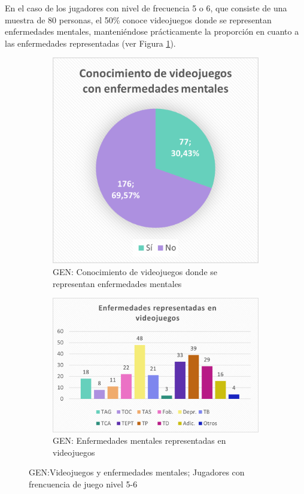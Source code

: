 \documentclass[12pt, a4paper,twoside,titlepage]{book}
\begin{document}
En el caso de los jugadores con nivel de frecuencia 5 o 6, que consiste de una muestra de 80 personas, el 50\% conoce videojuegos donde se representan enfermedades mentales, manteniéndose prácticamente la proporción en cuanto a las enfermedades representadas (ver Figura \ref{fig:Convid56}).


\begin{figure}
\centering
\begin{subfigure}{.4\textwidth}
  \centering
  \includegraphics[width=.95\linewidth]{Imagenes Form GEN/7GENConenf}
  \caption{GEN: Conocimiento de videojuegos donde se representan enfermedades mentales}
\end{subfigure}%
\begin{subfigure}{.6\textwidth}
  \centering
  \includegraphics[width=.95\linewidth]{Imagenes Form GEN/8GENConenf}
  \caption{GEN: Enfermedades mentales representadas en videojuegos}
\end{subfigure}
\caption{GEN:Videojuegos y enfermedades mentales; Jugadores con frencuencia de juego nivel 5-6}
\label{fig:Convid56}
\end{figure}
\end{document}
